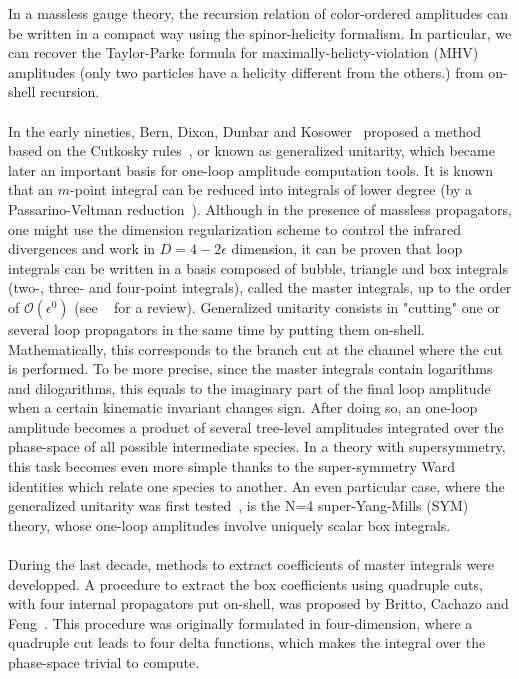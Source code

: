 In a massless gauge theory, the recursion relation of color-ordered amplitudes can be written in a compact way using the spinor-helicity formalism.
In particular, we can recover the Taylor-Parke formula for maximally-helicty-violation (MHV) amplitudes (\ie only two particles have a helicity different from the others.) from on-shell recursion.
\\\\
In the early nineties, Bern, Dixon, Dunbar and Kosower~\cite{Bern:1994zx} proposed a method based on the Cutkosky rules~\cite{doi:10.1063/1.1703676}, or known as generalized unitarity, which became later an important basis for one-loop amplitude computation tools.
It is known that an $m$-point integral can be reduced into integrals of lower degree (\eg by a Passarino-Veltman reduction~\cite{PASSARINO1979151}).
Although in the presence of massless propagators, one might use the dimension regularization scheme to control the infrared divergences and work in $D = 4-2\epsilon$ dimension, it can be proven that loop integrals can be written in a basis composed of bubble, triangle and box integrals (\ie two-, three- and four-point integrals), called the master integrals, up to the order of $\mathcal{O}(\epsilon^0)$ (see \eg~\cite{Gluza:2010ws} for a review).
Generalized unitarity consists in "cutting" one or several loop propagators in the same time by putting them on-shell.
Mathematically, this corresponds to the branch cut at the channel where the cut is performed. 
To be more precise, since the master integrals contain logarithms and dilogarithms, this equals to the imaginary part of the final loop amplitude when a certain kinematic invariant changes sign.
After doing so, an one-loop amplitude becomes a product of several tree-level amplitudes integrated over the phase-space of all possible intermediate species.
In a theory with supersymmetry, this task becomes even more simple thanks to the super-symmetry Ward identities which relate one species to another.
An even particular case, where the generalized unitarity was first tested~\cite{Bern:1994zx}, is the N=4 super-Yang-Mills (SYM) theory, whose one-loop amplitudes involve uniquely scalar box integrals. 
\\\\
During the last decade, methods to extract coefficients of master integrals were developped. 
A procedure to extract the box coefficients using quadruple cuts, \ie with four internal propagators put on-shell, was proposed by Britto, Cachazo and Feng~\cite{Britto:2004nc}. 
This procedure was originally formulated in four-dimension, where a quadruple cut leads to four delta functions, which makes the integral over the phase-space trivial to compute. 
